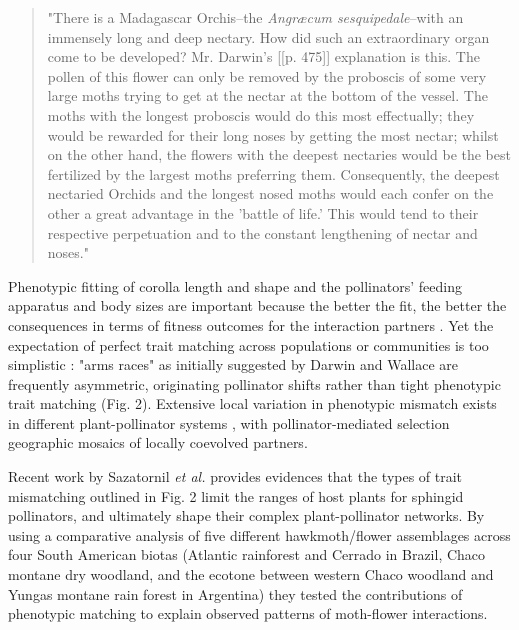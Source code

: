 \documentclass[a4paper,12pt]{article}
\begin{document}
\begin{spacing}{1.0}
	\begin{quotation}
	 "There is a Madagascar Orchis--the \textit{Angræcum sesquipedale}--with an immensely long and deep nectary. How did such an extraordinary organ come to be developed? Mr. Darwin's [[p. 475]] explanation is this. The pollen of this flower can only be removed by the proboscis of some very large moths trying to get at the nectar at the bottom of the vessel. The moths with the longest proboscis would do this most effectually; they would be rewarded for their long noses by getting the most nectar; whilst on the other hand, the flowers with the deepest nectaries would be the best fertilized by the largest moths preferring them. Consequently, the deepest nectaried Orchids and the longest nosed moths would each confer on the other a great advantage in the 'battle of life.' This would tend to their respective perpetuation and to the constant lengthening of nectar and noses."
	 \end{quotation}
 \end{spacing}
 
 Phenotypic fitting of corolla length and shape and the pollinators' feeding apparatus and body sizes are important because the better the fit, the better the consequences in terms of fitness outcomes for the interaction partners \citep{Nilsson:1988}. Yet the expectation of perfect trait matching across populations or communities is too simplistic \citep{Anderson:2010}: "arms races" as initially suggested by Darwin and Wallace are frequently asymmetric, originating pollinator shifts rather than tight phenotypic trait matching (Fig. 2)\citep{Wasserthal:2014}. Extensive local variation in phenotypic mismatch exists in different plant-pollinator systems \citep[e.g., ][]{Cocucci:2009,Anderson:2010,More:2012}, with pollinator-mediated selection geographic mosaics of locally coevolved partners.

Recent work by Sazatornil \textit{et al.} \citep{Sazatornil:2016} provides evidences that the types of trait mismatching outlined in Fig. 2 limit the ranges of host plants for sphingid pollinators, and ultimately shape their complex plant-pollinator networks. By using a comparative analysis of five different hawkmoth/flower assemblages across four South American biotas (Atlantic rainforest and Cerrado in Brazil, Chaco montane dry woodland, and the ecotone between western Chaco woodland and Yungas montane rain forest in Argentina) they tested the contributions of phenotypic matching to explain observed patterns of moth-flower interactions. 
\end{document}
